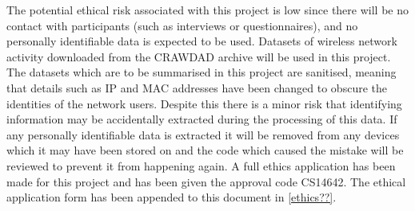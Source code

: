 The potential ethical risk associated with this project is low since there will be no contact with participants (such as interviews or questionnaires), and no personally identifiable data is expected to be used. 
Datasets of wireless network activity downloaded from the CRAWDAD archive will be used in this project. The datasets which are to be summarised in this project are sanitised, meaning that details such as IP and MAC addresses have been changed to obscure the identities of the network users. Despite this there is a minor risk that identifying information may be accidentally extracted during the processing of this data.
If any personally identifiable data is extracted it will be removed from any devices which it may have been stored on and the code which caused the mistake will be reviewed to prevent it from happening again. A full ethics application has been made for this project and has been given the approval code CS14642. The ethical application form has been appended to this document in \ref{ethics??}.